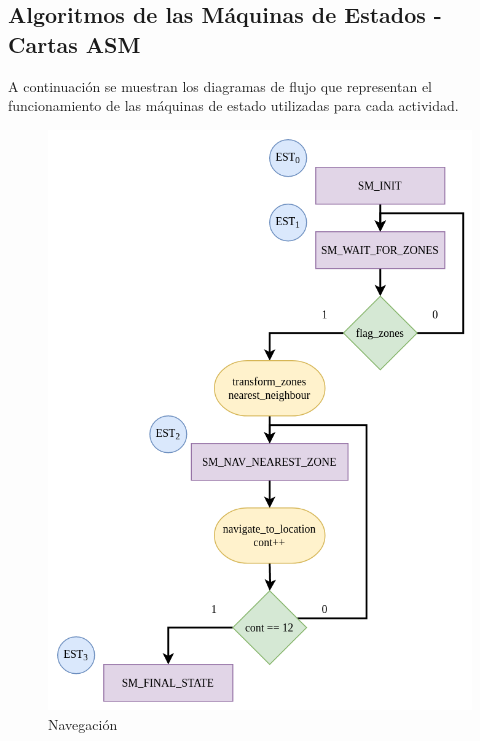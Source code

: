 \subsection{Algoritmos de las Máquinas de Estados - Cartas ASM}
A continuación se muestran los diagramas de flujo que representan el funcionamiento de las máquinas de estado utilizadas para cada actividad.

\begin{figure}[ht]
    \centering
    \includegraphics[scale= 0.4]{Figures/Navigation_CT.png}
        \caption{Navegación}
        \label{fig:ASM_Navigation}
    \end{figure}

